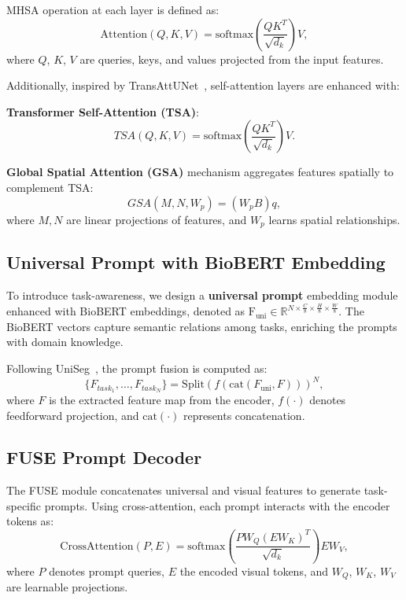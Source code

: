 \documentclass{cls/iutbscthesis}
\begin{document}
MHSA operation at each layer is defined as:
\begin{equation}
    \text{Attention}(Q, K, V) = \text{softmax}\left(\frac{QK^T}{\sqrt{d_k}}\right)V,
\end{equation}
where $Q$, $K$, $V$ are queries, keys, and values projected from the input features.
\par
Additionally, inspired by TransAttUNet~\cite{chen2024transattunet}, self-attention layers are enhanced with:
\par
\textbf{Transformer Self-Attention (TSA)}:
\begin{equation}
    TSA(Q, K, V) = \text{softmax}\left(\frac{QK^T}{\sqrt{d_k}}\right)V.
\end{equation}

\textbf{Global Spatial Attention (GSA)} mechanism aggregates features spatially to complement TSA:
\begin{equation}
    GSA(M, N, W_p) = (W_p B)q,
\end{equation}
where $M, N$ are linear projections of features, and $W_p$ learns spatial relationships.

\subsection{Universal Prompt with BioBERT Embedding}

To introduce task-awareness, we design a \textbf{universal prompt} embedding module enhanced with BioBERT embeddings, denoted as $\text{F}_{\text{uni}} \in \mathbb{R}^{N \times \frac{C}{8} \times \frac{H}{8} \times \frac{W}{8}}$. The BioBERT vectors capture semantic relations among tasks, enriching the prompts with domain knowledge.

Following UniSeg~\cite{ye2023uniseg}, the prompt fusion is computed as:
\begin{equation}
    \{F_{task_1}, \ldots, F_{task_N}\} = \text{Split}\left(f\left(\text{cat}(F_{\text{uni}}, F)\right)\right)^N,
\end{equation}
where $F$ is the extracted feature map from the encoder, $f(\cdot)$ denotes feedforward projection, and $\text{cat}(\cdot)$ represents concatenation.

\subsection{FUSE Prompt Decoder}

The FUSE module concatenates universal and visual features to generate task-specific prompts.
Using cross-attention, each prompt interacts with the encoder tokens as:
\begin{equation}
    \text{CrossAttention}(P, E) = \text{softmax}\left(\frac{P W_Q (E W_K)^T}{\sqrt{d_k}}\right) E W_V,
\end{equation}
where $P$ denotes prompt queries, $E$ the encoded visual tokens, and $W_Q$, $W_K$, $W_V$ are learnable projections.
\end{document}
